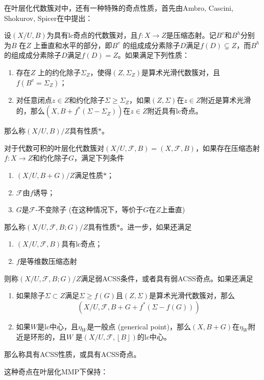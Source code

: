 在叶层化代数簇对中，还有一种特殊的奇点性质，首先由Ambro, Cascini, Shokurov, Spicer在\cite{acss}中提出：
\begin{definition}[ACSS奇点]\cite[Definition 4.1-3]{acc_foliation}
 设$ (X/U,B) $为具有lc奇点的代数簇对，且$f: X\to Z$是压缩态射。记$B^{v}$和$ B^{h}$分别为$B$ 在$Z$ 上垂直和水平的部分，即$B^{v}$ 的组成成分素除子$D$满足$f(D)\subsetneq Z $，而$B^{h}$  的组成成分素除子$D$满足$f(D)= Z$。如果满足下列性质：
 \begin{enumerate}
   \item 存在$Z$ 上的约化除子$\Sigma_{Z}$，使得$(Z,\Sigma_{Z}) $是算术光滑代数簇对，且$f(B^{v}=\Sigma_{Z})$；
   \item 对任意闭点$z \in Z$和约化除子$\Sigma \geqslant \Sigma_{Z}$，如果$(Z,\Sigma)$在$z \in Z$附近是算术光滑的，那么$(X,B+f^{*}(\Sigma-\Sigma_{Z}))$在$z \in Z$附近具有lc奇点。 
 \end{enumerate}
 那么称$(X/U,B)/Z$具有性质$*$。

 对于代数可积的叶层化代数簇对$(X/U,\mathcal{F},B)=(X,\mathcal{F},B)$，如果存在压缩态射$f:X \to Z$和约化除子$G$，满足下列条件
 \begin{enumerate}
   \item $(X/U,B+G)/Z$满足性质$*$；
   \item $\mathcal{F}$由$ f$诱导；
   \item $G$是$\mathcal{F}$-不变除子 (在这种情况下，等价于$G$在$Z$上垂直)
 \end{enumerate}
那么称$(X/U,\mathcal{F},B;G)/Z$具有性质$*$。进一步，如果还满足
\begin{enumerate}
  \item $(X/U,\mathcal{F},B)$具有lc奇点；
  \item $f$是等维数压缩态射
\end{enumerate}
则称$(X/U,\mathcal{F},B;G)/Z$满足弱ACSS条件，或者具有弱ACSS奇点。如果还满足
\begin{enumerate}
  \item 如果除子$\Sigma \subset Z$满足$\Sigma \geqslant f(G)$且$(Z,\Sigma)$是算术光滑代数簇对，那么
    \[ (X/U,\mathcal{F},B+G+f^{*}(\Sigma - f(G ))) \]
  \item 如果$W$是lc中心，且$ \eta_{W}$是一般点 (generical point)，那么$(X,B+G)$在$\eta_{W}$附近是环形的，且$W$ 是$(X/U,\mathcal{F},\left\lfloor B \right\rfloor )$的lc中心。
\end{enumerate}
那么称具有ACSS性质，或具有ACSS奇点。
\end{definition}
这种奇点在叶层化MMP下保持：
